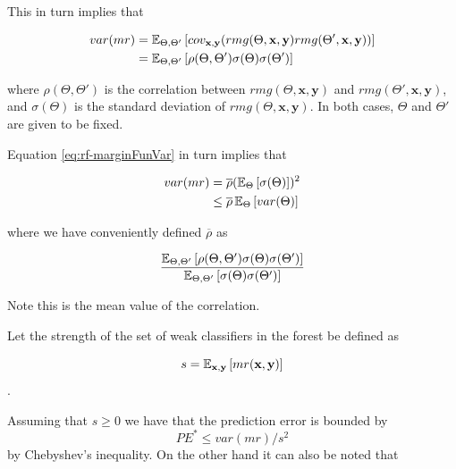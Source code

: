 This in turn implies that

\begin{equation}\label{eq:rf-marginFunVar}
\begin{split}
var(mr) & =  \operatorname{\mathbb{E}}_{\Theta, \Theta'}
\left[
cov_{\textbf{x},\textbf{y}}
(rmg(\Theta,\textbf{x},\textbf{y} )rmg(\Theta',\textbf{x},\textbf{y} ))
\right] \\
& =  \operatorname{\mathbb{E}}_{\Theta, \Theta'}
\left[
\rho(\Theta, \Theta')\sigma(\Theta)\sigma(\Theta')
\right]
\end{split}
\end{equation}

where $ \rho(\Theta, \Theta')$ is the correlation between $rmg(\Theta,\textbf{x},\textbf{y})$ and $rmg(\Theta',\textbf{x},\textbf{y})$, and $\sigma(\Theta)$ is the standard deviation of $rmg(\Theta,\textbf{x},\textbf{y})$. In both cases, $\Theta$ and $\Theta'$ are given to be fixed.

Equation \ref{eq:rf-marginFunVar} in turn implies that

\begin{equation}\label{eq:rf-varianceBound}
\begin{split}
var(mr) & =  \overline{\rho} (\operatorname{\mathbb{E}}_{\Theta}\left[ \sigma(\Theta)\right] )^2 \\
& \leq  \overline{\rho} \operatorname{\mathbb{E}}_{\Theta} \left[ var(\Theta) \right]
\end{split}
\end{equation}

where we have conveniently defined $\overline{\rho}$ as

\begin{equation}\label{eq:rf-meanCorrelation}
\frac{\operatorname{\mathbb{E}}_{\Theta, \Theta'} \left[ \rho(\Theta, \Theta') \sigma(\Theta) \sigma(\Theta')\right]}
{\operatorname{\mathbb{E}}_{\Theta, \Theta'} \left[ \sigma(\Theta) \sigma(\Theta')\right]}
\end{equation}

Note this is the mean value of the correlation.

Let the strength of the set of weak classifiers in the forest be defined as

\begin{equation}
s =  \operatorname{\mathbb{E}}_{\textbf{x},\textbf{y}} \left[ mr(\textbf{x},\textbf{y} ) \right] 
\end{equation}
.\label{eq:rf-strength}


Assuming that $s \geq 0$ we have that the prediction error is bounded by
\begin{equation}\label{eq:rf-predictiveErrorBound1}
PE^* \leq var(mr)/s^2
\end{equation}
by Chebyshev's inequality. On the other hand it can also be noted that


